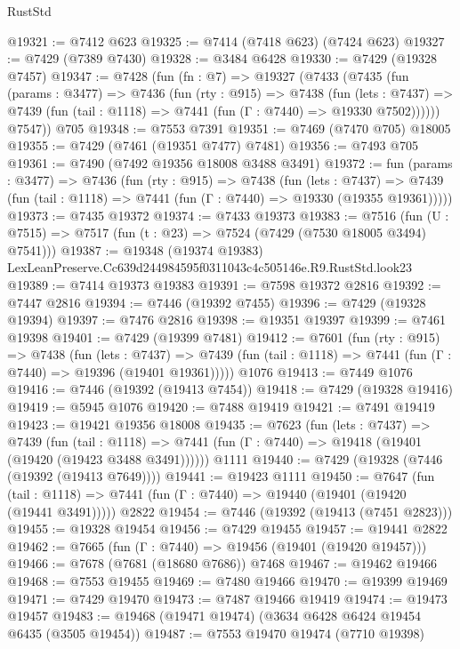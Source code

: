 \begin{lexlean}{RustStd}
\begin{coremodule}
@19321 := @7412 @623
@19325 := @7414 (@7418 @623) (@7424 @623)
@19327 := @7429 (@7389 @7430)
@19328 := @3484 @6428
@19330 := @7429 (@19328 @7457)
@19347 := @7428
    (fun (fn : @7) =>
    @19327
      (@7433
        (@7435
          (fun (params : @3477) =>
          @7436
            (fun (rty : @915) =>
            @7438
              (fun (lets : @7437) =>
              @7439 (fun (tail : @1118) => @7441 (fun (Γ : @7440) => @19330 @7502))))))
        @7547))
    @705
@19348 := @7553 @7391
@19351 := @7469 (@7470 @705) @18005
@19355 := @7429 (@7461 (@19351 @7477) @7481)
@19356 := @7493 @705
@19361 := @7490 (@7492 @19356 @18008 @3488 @3491)
@19372 := fun (params : @3477) =>
  @7436
    (fun (rty : @915) =>
    @7438
      (fun (lets : @7437) =>
      @7439 (fun (tail : @1118) => @7441 (fun (Γ : @7440) => @19330 (@19355 @19361)))))
@19373 := @7435 @19372
@19374 := @7433 @19373
@19383 := @7516
    (fun (U : @7515) => @7517 (fun (t : @23) => @7524 (@7429 (@7530 @18005 @3494) @7541)))
@19387 := @19348 (@19374 @19383) LexLeanPreserve.Cc639d244984595f0311043c4c505146e.R9.RustStd.look23
@19389 := @7414 @19373 @19383
@19391 := @7598 @19372 @2816
@19392 := @7447 @2816
@19394 := @7446 (@19392 @7455)
@19396 := @7429 (@19328 @19394)
@19397 := @7476 @2816
@19398 := @19351 @19397
@19399 := @7461 @19398
@19401 := @7429 (@19399 @7481)
@19412 := @7601
    (fun (rty : @915) =>
    @7438
      (fun (lets : @7437) =>
      @7439 (fun (tail : @1118) => @7441 (fun (Γ : @7440) => @19396 (@19401 @19361)))))
    @1076
@19413 := @7449 @1076
@19416 := @7446 (@19392 (@19413 @7454))
@19418 := @7429 (@19328 @19416)
@19419 := @5945 @1076
@19420 := @7488 @19419
@19421 := @7491 @19419
@19423 := @19421 @19356 @18008
@19435 := @7623
    (fun (lets : @7437) =>
    @7439
      (fun (tail : @1118) =>
      @7441 (fun (Γ : @7440) => @19418 (@19401 (@19420 (@19423 @3488 @3491))))))
    @1111
@19440 := @7429 (@19328 (@7446 (@19392 (@19413 @7649))))
@19441 := @19423 @1111
@19450 := @7647
    (fun (tail : @1118) => @7441 (fun (Γ : @7440) => @19440 (@19401 (@19420 (@19441 @3491)))))
    @2822
@19454 := @7446 (@19392 (@19413 (@7451 @2823)))
@19455 := @19328 @19454
@19456 := @7429 @19455
@19457 := @19441 @2822
@19462 := @7665 (fun (Γ : @7440) => @19456 (@19401 (@19420 @19457)))
@19466 := @7678 (@7681 (@18680 @7686)) @7468
@19467 := @19462 @19466
@19468 := @7553 @19455
@19469 := @7480 @19466
@19470 := @19399 @19469
@19471 := @7429 @19470
@19473 := @7487 @19466 @19419
@19474 := @19473 @19457
@19483 := @19468 (@19471 @19474) (@3634 @6428 @6424 @19454 @6435 (@3505 @19454))
@19487 := @7553 @19470 @19474 (@7710 @19398)

\end{coremodule}
\end{lexlean}
